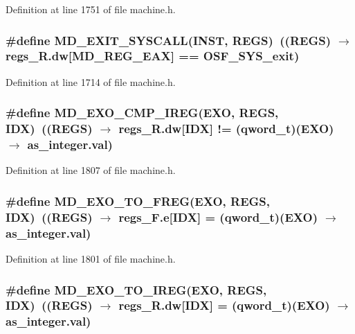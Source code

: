 Definition at line 1751 of file machine.h.
\subsubsection[{MD\_\-EXIT\_\-SYSCALL}]{\setlength{\rightskip}{0pt plus 5cm}\#define MD\_\-EXIT\_\-SYSCALL(INST, \/  REGS)~((REGS) $\rightarrow$ regs\_\-R.dw[MD\_\-REG\_\-EAX] == OSF\_\-SYS\_\-exit)}\label{machine_8h_0006ef49ba5b188c9fbe12536b91d321}




Definition at line 1714 of file machine.h.
\subsubsection[{MD\_\-EXO\_\-CMP\_\-IREG}]{\setlength{\rightskip}{0pt plus 5cm}\#define MD\_\-EXO\_\-CMP\_\-IREG(EXO, \/  REGS, \/  IDX)~((REGS) $\rightarrow$ regs\_\-R.dw[IDX] != (qword\_\-t)(EXO) $\rightarrow$ as\_\-integer.val)}\label{machine_8h_3c7516d2d8c5675a4731bde50468195f}




Definition at line 1807 of file machine.h.
\subsubsection[{MD\_\-EXO\_\-TO\_\-FREG}]{\setlength{\rightskip}{0pt plus 5cm}\#define MD\_\-EXO\_\-TO\_\-FREG(EXO, \/  REGS, \/  IDX)~((REGS) $\rightarrow$ regs\_\-F.e[IDX] = (qword\_\-t)(EXO) $\rightarrow$ as\_\-integer.val)}\label{machine_8h_3185c111af4beb2cd109572818f03d3b}




Definition at line 1801 of file machine.h.
\subsubsection[{MD\_\-EXO\_\-TO\_\-IREG}]{\setlength{\rightskip}{0pt plus 5cm}\#define MD\_\-EXO\_\-TO\_\-IREG(EXO, \/  REGS, \/  IDX)~((REGS) $\rightarrow$ regs\_\-R.dw[IDX] = (qword\_\-t)(EXO) $\rightarrow$ as\_\-integer.val)}\label{machine_8h_5692fba8a100469744196af18d121956}




